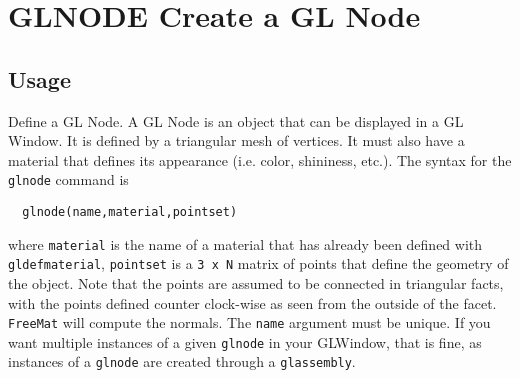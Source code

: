\section{GLNODE Create a GL Node}

\subsection{Usage}

Define a GL Node.  A GL Node is an object that can be displayed
in a GL Window.  It is defined by a triangular mesh of vertices.
It must also have a material that defines its appearance (i.e.
color, shininess, etc.).  The syntax for the \verb|glnode| command
is 
\begin{verbatim}
  glnode(name,material,pointset)  
\end{verbatim}
where \verb|material| is the name of a material that has already been
defined with \verb|gldefmaterial|, \verb|pointset| is a \verb|3 x N| matrix
of points that define the geometry of the object.  Note that the points
are assumed to be connected in triangular facts, with the points
defined counter clock-wise as seen from the outside of the facet.
\verb|FreeMat| will compute the normals.  The \verb|name| argument must
be unique.  If you want multiple instances of a given \verb|glnode|
in your GLWindow, that is fine, as instances of a \verb|glnode| are
created through a \verb|glassembly|.  
